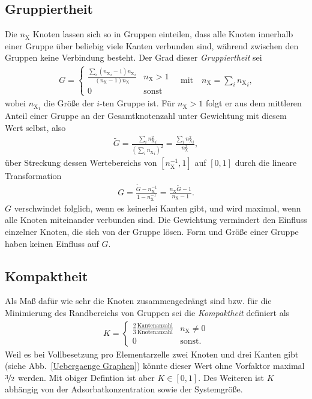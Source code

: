 \documentclass[a4paper, 10pt, twoside, openany]{book} %
\def \nX {n_\mathrm{X}}
\begin{document}
\subsection{Gruppiertheit}

Die $\nX$ Knoten lassen sich so in Gruppen einteilen, dass alle Knoten innerhalb einer Gruppe über beliebig viele Kanten verbunden sind, während zwischen den Gruppen keine Verbindung besteht. Der Grad dieser \emph{Gruppiertheit} sei
%
\begin{align*}
    G = \begin{cases} \frac{\sum_i ({\nX}_i - 1) {\nX}_i}{(\nX - 1) \nX} & \nX > 1 \\ 0 & \text{sonst} \end{cases} \quad \text{mit} \quad \nX = \sum_i {\nX}_i,
\end{align*}
%
wobei ${\nX}_i$ die Größe der $i$-ten Gruppe ist. Für $\nX > 1$ folgt er aus dem mittleren Anteil einer Gruppe an der Gesamtknotenzahl unter Gewichtung mit diesem Wert selbst, also
%
\begin{align*}
    \tilde G = \frac{\sum_i {\nX^2}_i}{(\sum_i {\nX}_i)^2} = \frac{\sum_i {\nX^2}_i}{\nX^2},
\end{align*}
%
über Streckung dessen Wertebereichs von $[\nX^{-1}, 1]$ auf $[0, 1]$ durch die lineare Transformation
%
\begin{align*}
    G = \frac{\tilde G - \nX^{-1}}{1 - \nX^{-1}} = \frac{\nX \tilde G - 1}{\nX - 1}.
\end{align*}
%
$G$ verschwindet folglich, wenn es keinerlei Kanten gibt, und wird maximal, wenn alle Knoten miteinander verbunden sind. Die Gewichtung vermindert den Einfluss einzelner Knoten, die sich von der Gruppe lösen. Form und Größe einer Gruppe haben keinen Einfluss auf $G$.

\subsection{Kompaktheit}

Als Maß dafür wie sehr die Knoten zusammengedrängt sind bzw. für die Minimierung des Randbereichs von Gruppen sei die \emph{Kompaktheit} definiert als
%
\begin{align*}
    K = \begin{cases} \frac 2 3 \frac{\text{Kantenanzahl}}{\text{Knotenanzahl}} & \nX \neq 0 \\ 0 & \text{sonst.} \end{cases}
\end{align*}
%
Weil es bei Vollbesetzung pro Elementarzelle zwei Knoten und drei Kanten gibt (siehe Abb.~\ref{Uebergaenge Graphen}) könnte dieser Wert ohne Vorfaktor maximal $\nicefrac 3 2$ werden. Mit obiger Defintion ist aber $K \in [0, 1]$. Des Weiteren ist $K$ abhängig von der Adsorbatkonzentration sowie der Systemgröße.
\end{document}
